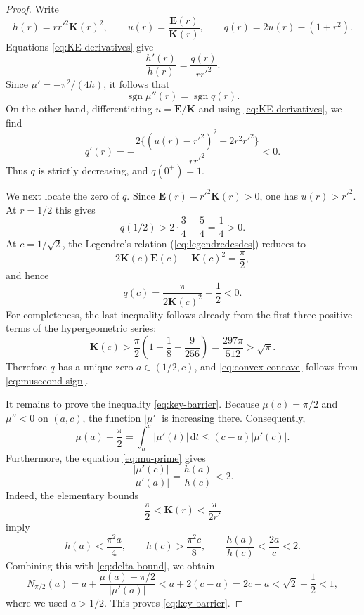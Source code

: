\documentclass[11pt]{article}
\theoremstyle{remark}
\newcommand{\Kc}{\mathbf K}
\newcommand{\Ec}{\mathbf E}
\newcommand{\dd}{\,\mathrm d}
\begin{document}
\begin{proof}
Write
\[
 h(r)=rr'^2\Kc(r)^2,
 \qquad
 u(r)=\frac{\Ec(r)}{\Kc(r)},
 \qquad
 q(r)=2u(r)-(1+r^2).
\]
Equations \eqref{eq:KE-derivatives} give
\begin{equation}\label{eq:h-log}
 \frac{h'(r)}{h(r)}=\frac{q(r)}{rr'^2}.
\end{equation}
Since $\mu'=-\pi^2/(4h)$, it follows that
\begin{equation}\label{eq:musecond-sign}
 \operatorname{sgn}\mu''(r)=\operatorname{sgn}q(r).
\end{equation}
On the other hand, differentiating $u=\Ec/\Kc$ and using
\eqref{eq:KE-derivatives}, we find
\begin{equation}\label{eq:qprime}
 q'(r)=-\frac{2\{(u(r)-r'^2)^2+2r^2r'^2\}}{rr'^2}<0.
\end{equation}
Thus $q$ is strictly decreasing, and $q(0^+)=1$.

We next locate the zero of $q.$  Since $\Ec(r)-r'^2\Kc(r)>0$, one has $u(r)>r'^2$.  At $r=1/2$ this
gives
\[
 q(1/2)>2\cdot\frac34-\frac54=\frac14>0.
\]
At $c=1/\sqrt2$, the Legendre's relation (\ref{eq:legendredcsdcs}) reduces to
\[
 2\Kc(c)\Ec(c)-\Kc(c)^2=\frac\pi2,
\]
and hence
\[
 q(c)=\frac{\pi}{2\Kc(c)^2}-\frac12<0.
\]
For completeness, the last inequality follows already from the first three
positive terms of the hypergeometric series:
\[
 \Kc(c)>
 \frac\pi2\left(1+\frac18+\frac9{256}\right)
 =\frac{297\pi}{512}>\sqrt\pi.
\]
Therefore $q$ has a unique zero $a\in(1/2,c)$, and
\eqref{eq:convex-concave} follows from \eqref{eq:musecond-sign}.

It remains to prove the inequality \eqref{eq:key-barrier}.  Because
$\mu(c)=\pi/2$ and $\mu''<0$ on $(a,c)$, the function
$|\mu'|$ is increasing there.  Consequently,
\begin{equation}\label{eq:delta-bound}
 \mu(a)-\frac\pi2
 =\int_a^c|\mu'(t)|\dd t
 \le(c-a)|\mu'(c)|.
\end{equation}
Furthermore, the equation \eqref{eq:mu-prime} gives
\[
 \frac{|\mu'(c)|}{|\mu'(a)|}=\frac{h(a)}{h(c)}<2.
\]
Indeed, the elementary bounds
\[
 \frac\pi2<\Kc(r)<\frac\pi{2r'}
\]
imply
\[
 h(a)<\frac{\pi^2a}{4},
 \qquad
 h(c)>\frac{\pi^2c}{8},
 \qquad
 \frac{h(a)}{h(c)}<\frac{2a}{c}<2.
\]
Combining this with \eqref{eq:delta-bound}, we obtain
\[
 N_{\pi/2}(a)
 =a+\frac{\mu(a)-\pi/2}{|\mu'(a)|}
 <a+2(c-a)=2c-a
 <\sqrt2-\frac12<1,
\]
where we used $a>1/2$.  This proves \eqref{eq:key-barrier}.
\end{proof}
\end{document}
